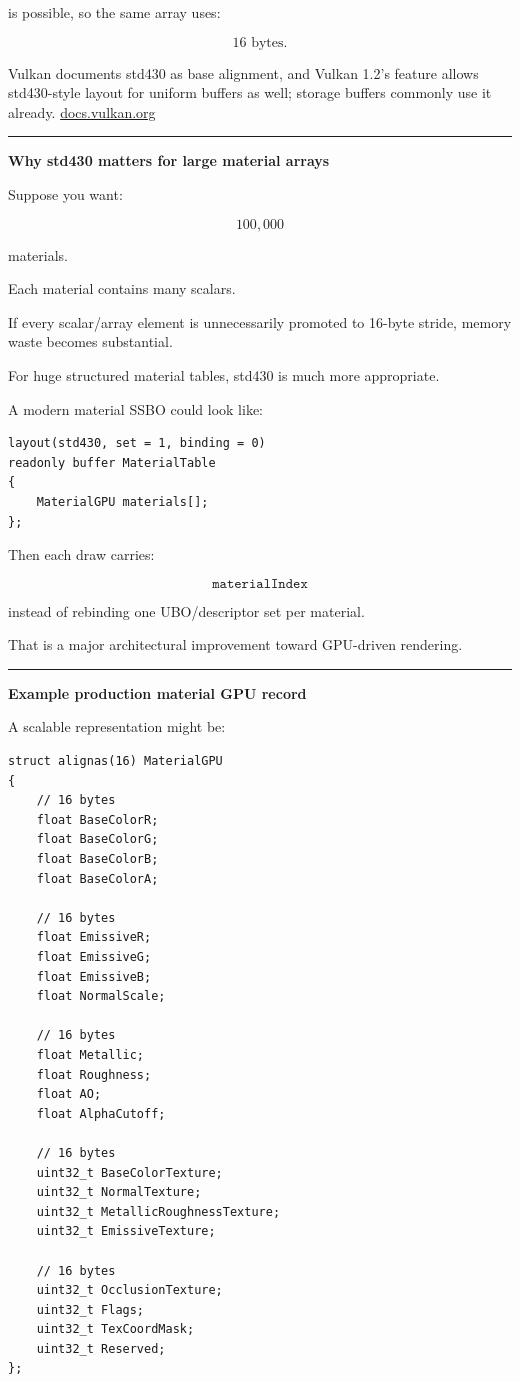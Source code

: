 is possible, so the same array uses:

\[
16\text{ bytes}.
\]

Vulkan documents std430 as base alignment, and Vulkan 1.2's  feature allows std430-style layout for uniform buffers as well; storage buffers commonly use it already. \href{https://docs.vulkan.org/guide/latest/shader_memory_layout.html?utm_source=chatgpt.com}{docs.vulkan.org}

\begin{center}\rule{0.5\linewidth}{0.5pt}\end{center}

\textbf{Why std430 matters for large material arrays}

Suppose you want:

\[
100,000
\]

materials.

Each material contains many scalars.

If every scalar/array element is unnecessarily promoted to 16-byte stride, memory waste becomes substantial.

For huge structured material tables, std430 is much more appropriate.

A modern material SSBO could look like:

\begin{verbatim}
layout(std430, set = 1, binding = 0)
readonly buffer MaterialTable
{
    MaterialGPU materials[];
};
\end{verbatim}

Then each draw carries:

\[
\texttt{materialIndex}
\]

instead of rebinding one UBO/descriptor set per material.

That is a major architectural improvement toward GPU-driven rendering.

\begin{center}\rule{0.5\linewidth}{0.5pt}\end{center}

\textbf{Example production material GPU record}

A scalable representation might be:

\begin{verbatim}
struct alignas(16) MaterialGPU
{
    // 16 bytes
    float BaseColorR;
    float BaseColorG;
    float BaseColorB;
    float BaseColorA;

    // 16 bytes
    float EmissiveR;
    float EmissiveG;
    float EmissiveB;
    float NormalScale;

    // 16 bytes
    float Metallic;
    float Roughness;
    float AO;
    float AlphaCutoff;

    // 16 bytes
    uint32_t BaseColorTexture;
    uint32_t NormalTexture;
    uint32_t MetallicRoughnessTexture;
    uint32_t EmissiveTexture;

    // 16 bytes
    uint32_t OcclusionTexture;
    uint32_t Flags;
    uint32_t TexCoordMask;
    uint32_t Reserved;
};
\end{verbatim}

